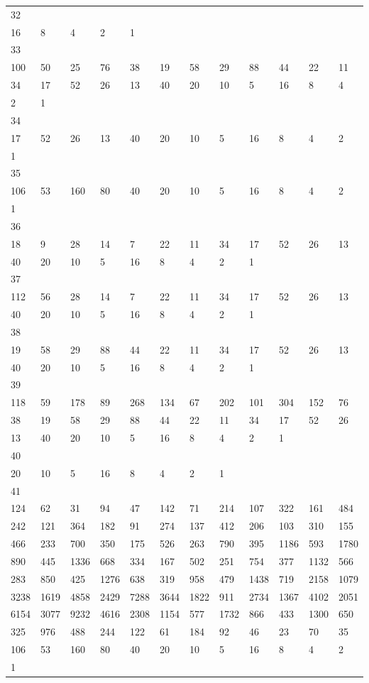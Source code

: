 \begin{longtable}{llllllllllll}
32&&&&&&&&&&&\\
16& 8& 4& 2& 1& \\

33&&&&&&&&&&&\\
100& 50& 25& 76& 38& 19& 58& 29& 88& 44& 22& 11\\
34& 17& 52& 26& 13& 40& 20& 10& 5& 16& 8& 4\\
2& 1& \\

34&&&&&&&&&&&\\
17& 52& 26& 13& 40& 20& 10& 5& 16& 8& 4& 2\\
1& \\

35&&&&&&&&&&&\\
106& 53& 160& 80& 40& 20& 10& 5& 16& 8& 4& 2\\
1& \\

36&&&&&&&&&&&\\
18& 9& 28& 14& 7& 22& 11& 34& 17& 52& 26& 13\\
40& 20& 10& 5& 16& 8& 4& 2& 1& \\

37&&&&&&&&&&&\\
112& 56& 28& 14& 7& 22& 11& 34& 17& 52& 26& 13\\
40& 20& 10& 5& 16& 8& 4& 2& 1& \\

38&&&&&&&&&&&\\
19& 58& 29& 88& 44& 22& 11& 34& 17& 52& 26& 13\\
40& 20& 10& 5& 16& 8& 4& 2& 1& \\

39&&&&&&&&&&&\\
118& 59& 178& 89& 268& 134& 67& 202& 101& 304& 152& 76\\
38& 19& 58& 29& 88& 44& 22& 11& 34& 17& 52& 26\\
13& 40& 20& 10& 5& 16& 8& 4& 2& 1& \\

40&&&&&&&&&&&\\
20& 10& 5& 16& 8& 4& 2& 1& \\

41&&&&&&&&&&&\\
124& 62& 31& 94& 47& 142& 71& 214& 107& 322& 161& 484\\
242& 121& 364& 182& 91& 274& 137& 412& 206& 103& 310& 155\\
466& 233& 700& 350& 175& 526& 263& 790& 395& 1186& 593& 1780\\
890& 445& 1336& 668& 334& 167& 502& 251& 754& 377& 1132& 566\\
283& 850& 425& 1276& 638& 319& 958& 479& 1438& 719& 2158& 1079\\
3238& 1619& 4858& 2429& 7288& 3644& 1822& 911& 2734& 1367& 4102& 2051\\
6154& 3077& 9232& 4616& 2308& 1154& 577& 1732& 866& 433& 1300& 650\\
325& 976& 488& 244& 122& 61& 184& 92& 46& 23& 70& 35\\
106& 53& 160& 80& 40& 20& 10& 5& 16& 8& 4& 2\\
1& \\


\end{longtable}
